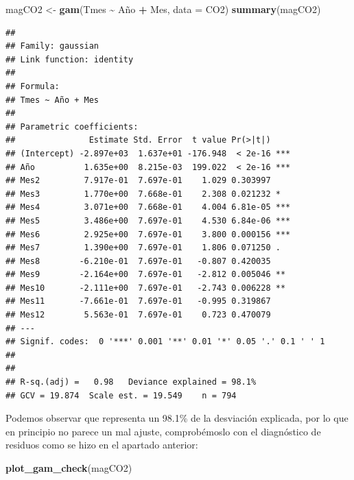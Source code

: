 \documentclass[12pt,a4paper,]{book}
\newenvironment{Shaded}{\begin{snugshade}}{\end{snugshade}}
\newcommand{\AttributeTok}[1]{\textcolor[rgb]{0.13,0.29,0.53}{#1}}
\newcommand{\FunctionTok}[1]{\textcolor[rgb]{0.13,0.29,0.53}{\textbf{#1}}}
\newcommand{\NormalTok}[1]{#1}
\newcommand{\OtherTok}[1]{\textcolor[rgb]{0.56,0.35,0.01}{#1}}
\newcommand{\SpecialCharTok}[1]{\textcolor[rgb]{0.81,0.36,0.00}{\textbf{#1}}}
\numberwithin{dummy}{section}
\theoremstyle{ocrenumbox}
\theoremstyle{blacknumex}
\theoremstyle{blacknumbox}
\theoremstyle{ocrenum}
\theoremstyle{ocrenum}
\begin{document}
\begin{Shaded}
\begin{Highlighting}[]
\NormalTok{magCO2 }\OtherTok{\textless{}{-}} \FunctionTok{gam}\NormalTok{(Tmes }\SpecialCharTok{\textasciitilde{}}\NormalTok{ Año }\SpecialCharTok{+}\NormalTok{ Mes, }\AttributeTok{data =}\NormalTok{ CO2)}
\FunctionTok{summary}\NormalTok{(magCO2)}
\end{Highlighting}
\end{Shaded}

\begin{verbatim}
## 
## Family: gaussian 
## Link function: identity 
## 
## Formula:
## Tmes ~ Año + Mes
## 
## Parametric coefficients:
##               Estimate Std. Error  t value Pr(>|t|)    
## (Intercept) -2.897e+03  1.637e+01 -176.948  < 2e-16 ***
## Año          1.635e+00  8.215e-03  199.022  < 2e-16 ***
## Mes2         7.917e-01  7.697e-01    1.029 0.303997    
## Mes3         1.770e+00  7.668e-01    2.308 0.021232 *  
## Mes4         3.071e+00  7.668e-01    4.004 6.81e-05 ***
## Mes5         3.486e+00  7.697e-01    4.530 6.84e-06 ***
## Mes6         2.925e+00  7.697e-01    3.800 0.000156 ***
## Mes7         1.390e+00  7.697e-01    1.806 0.071250 .  
## Mes8        -6.210e-01  7.697e-01   -0.807 0.420035    
## Mes9        -2.164e+00  7.697e-01   -2.812 0.005046 ** 
## Mes10       -2.111e+00  7.697e-01   -2.743 0.006228 ** 
## Mes11       -7.661e-01  7.697e-01   -0.995 0.319867    
## Mes12        5.563e-01  7.697e-01    0.723 0.470079    
## ---
## Signif. codes:  0 '***' 0.001 '**' 0.01 '*' 0.05 '.' 0.1 ' ' 1
## 
## 
## R-sq.(adj) =   0.98   Deviance explained = 98.1%
## GCV = 19.874  Scale est. = 19.549    n = 794
\end{verbatim}

Podemos observar que representa un 98.1\% de la desviación explicada,
por lo que en principio no parece un mal ajuste, comprobémoslo con el
diagnóstico de residuos como se hizo en el apartado anterior:

\begin{Shaded}
\begin{Highlighting}[]
\FunctionTok{plot\_gam\_check}\NormalTok{(magCO2)}
\end{Highlighting}
\end{Shaded}
\end{document}
